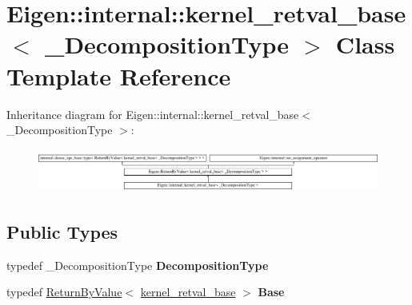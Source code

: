 \hypertarget{struct_eigen_1_1internal_1_1kernel__retval__base}{}\section{Eigen\+::internal\+::kernel\+\_\+retval\+\_\+base$<$ \+\_\+\+Decomposition\+Type $>$ Class Template Reference}
\label{struct_eigen_1_1internal_1_1kernel__retval__base}
Inheritance diagram for Eigen\+::internal\+::kernel\+\_\+retval\+\_\+base$<$ \+\_\+\+Decomposition\+Type $>$\+:\begin{figure}[H]
\begin{center}
\leavevmode
\includegraphics[height=1.465969cm]{struct_eigen_1_1internal_1_1kernel__retval__base}
\end{center}
\end{figure}
\subsection*{Public Types}
\begin{DoxyCompactItemize}
\item 
\mbox{\label{struct_eigen_1_1internal_1_1kernel__retval__base_a6b10bb396c0cb35e768a15ad1ce76b14}} 
typedef \+\_\+\+Decomposition\+Type {\bfseries Decomposition\+Type}
\item 
\mbox{\label{struct_eigen_1_1internal_1_1kernel__retval__base_a2d5e5e8e131daa386f63e38d55a8221d}} 
typedef \mbox{\hyperlink{class_eigen_1_1_return_by_value}{Return\+By\+Value}}$<$ \mbox{\hyperlink{struct_eigen_1_1internal_1_1kernel__retval__base}{kernel\+\_\+retval\+\_\+base}} $>$ {\bfseries Base}
\end{DoxyCompactItemize}
